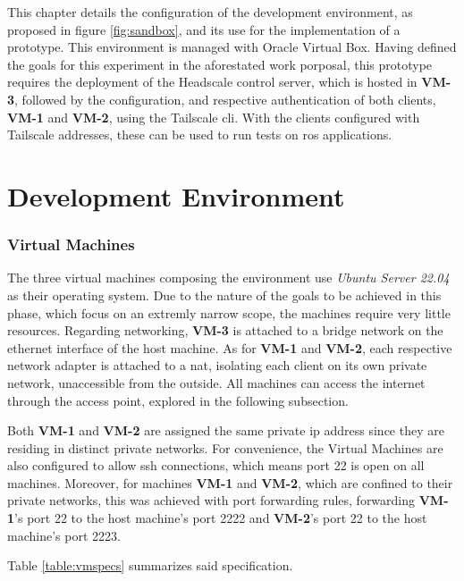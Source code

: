 \documentclass[11pt,twoside,a4paper]{report}
\begin{document}
This chapter details the configuration of the development environment, as proposed in figure \ref{fig:sandbox}, and its use for the implementation of a prototype. This environment is managed with Oracle Virtual Box. Having defined the goals for this experiment in the aforestated work porposal, this prototype requires the deployment of the Headscale control server, which is hosted in \textbf{VM-3}, followed by the configuration, and respective authentication of both clients, \textbf{VM-1} and \textbf{VM-2}, using the Tailscale \ac{cli}. With the clients configured with Tailscale addresses, these can be used to run tests on \ac{ros} applications.

\section{Development Environment}

\subsubsection{Virtual Machines}

The three virtual machines composing the environment use \emph{Ubuntu Server 22.04} as their operating system. Due to the nature of the goals to be achieved in this phase, which focus on an extremly narrow scope, the machines require very little resources. Regarding networking, \textbf{VM-3} is attached to a bridge network on the ethernet interface of the host machine. As for \textbf{VM-1} and \textbf{VM-2}, each respective network adapter is attached to a \ac{nat}, isolating each client on its own private network, unaccessible from the outside. All machines can access the internet through the access point, explored in the following subsection.

Both \textbf{VM-1} and \textbf{VM-2} are assigned the same private \ac{ip} address since they are residing in distinct private networks. For convenience, the Virtual Machines are also configured to allow \ac{ssh} connections, which means port 22 is open on all machines. Moreover, for machines \textbf{VM-1} and \textbf{VM-2}, which are confined to their private networks, this was achieved with port forwarding rules, forwarding \textbf{VM-1}'s port 22 to the host machine's port 2222 and \textbf{VM-2}'s port 22 to the host machine's port 2223.

Table \ref{table:vmspecs} summarizes said specification.
\end{document}
